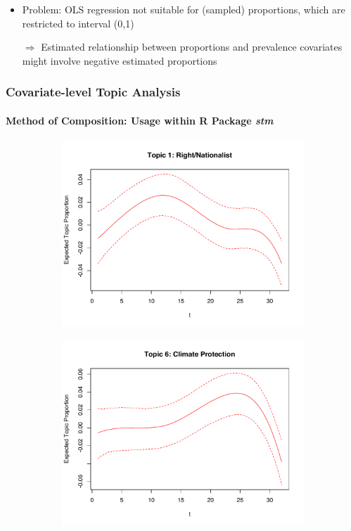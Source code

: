 \documentclass[xcolor=dvipsnames]{beamer}
\begin{document}
\begin{frame}
\begin{itemize}
\item Problem: OLS regression not suitable for (sampled) proportions, which are restricted to interval (0,1)
\item[$\Rightarrow$] Estimated relationship between proportions and prevalence covariates might involve negative estimated proportions
\end{itemize}
\frametitle{Covariate-level Topic Analysis}
\framesubtitle{Method of Composition: Usage within R Package \textit{stm}}
  \begin{figure}[h!]
  \centering
  \captionsetup{justification=centering,margin=2cm}
  \begin{subfigure}[b]{0.4\linewidth}
    \includegraphics[width=\linewidth]{../../plots/presentation/estEffect_topic1.pdf}
  \end{subfigure}
  \begin{subfigure}[b]{0.4\linewidth}
    \includegraphics[width=\linewidth]{../../plots/presentation/estEffect_topic6.pdf}

\end{subfigure}
\end{figure}
\end{frame}
\end{document}
